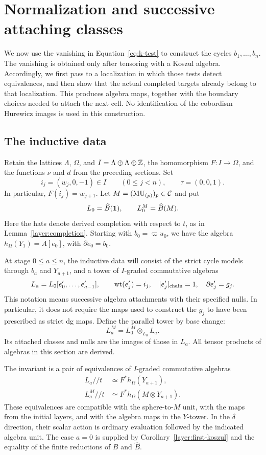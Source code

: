 \section{Normalization and successive attaching classes}
\label{sec:normalization}

We now use the vanishing in Equation~\eqref{eq:k-test} to construct
the cycles $b_1,\ldots,b_n$.  The vanishing is obtained only after
tensoring with a Koszul algebra.  Accordingly, we first pass to a
localization in which those tests detect equivalences, and then show
that the actual completed targets already belong to that localization.
This produces algebra maps, together with the boundary choices needed
to attach the next cell.  No identification of the cobordism Hurewicz
images is used in this construction.

\subsection{The inductive data}

Retain the lattices $\Lambda$, $\Omega$, and
$I=\Lambda\oplus\Lambda\oplus\mathbb Z$, the homomorphism $F:I\to\Omega$,
and the functions $\nu$ and $d$ from the preceding sections.  Set
\[
 i_j=(w_j,0,-1)\in I \qquad (0\leq j<n),
 \qquad \tau=(0,0,1).
\]
In particular, $F(i_j)=w_{j+1}$.  Let
$M=(\mathrm{MU}_{(p)})_p\in\mathcal C$ and put
\[
 L_0=\widehat B(\mathbf 1),\qquad L_0^M=\widehat B(M).
\]
Here the hats denote derived completion with respect to $t$, as in
Lemma~\ref{layer:completion}.  Starting with
$b_0=\varpi u_0$, we have the algebra
$h_\Omega(Y_1)=A[e_0]$, with $\partial e_0=b_0$.

At stage $0\leq a\leq n$, the inductive data will consist of the
strict cycle models through $b_a$ and $Y_{a+1}$, and a tower of
$I$-graded commutative algebras
\[
 L_a=L_0[e'_0,\ldots,e'_{a-1}],\qquad
 \operatorname{wt}(e'_j)=i_j,\quad |e'_j|_{\mathrm{chain}}=1,
 \quad \partial e'_j=g_j.
\]
This notation means successive algebra attachments with their
specified nulls.  In particular, it does not require the maps used to
construct the $g_j$ to have been prescribed as strict dg maps.  Define
the parallel tower by base change:
\[
 L_a^M=L_0^M\otimes_{L_0}L_a.
\]
Its attached classes and nulls are the images of those in $L_a$.
All tensor products of algebras in this section are derived.

The invariant is a pair of equivalences of $I$-graded commutative
algebras
\begin{equation}
\label{eq:target-layer}
 \begin{aligned}
 L_a//t&\simeq F^*h_\Omega(Y_{a+1}),\\
 L_a^M//t&\simeq F^*h_\Omega(M\otimes Y_{a+1}).
 \end{aligned}
\end{equation}
These equivalences are compatible with the sphere-to-$M$ unit, with
the maps from the initial layers, and with the algebra maps in the
$Y$-tower.  In the $\delta$ direction, their scalar action is ordinary
evaluation followed by the indicated algebra unit.  The case $a=0$
is supplied by Corollary~\ref{layer:first-koszul} and the equality of the
finite reductions of $B$ and $\widehat B$.

